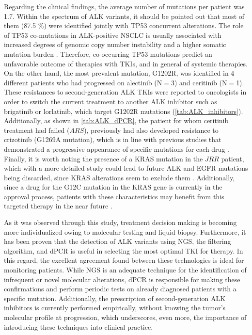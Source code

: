 Regarding the clinical findings, the average number of mutations per patient was 1.7. Within the spectrum of ALK variants, it should be pointed out that most of them (87.5 \%) were identified jointly with TP53 concurrent alterations. The role of TP53 co-mutations in ALK-positive NSCLC is usually associated with increased degrees of genomic copy number instability and a higher somatic mutation burden \cite{NSCLC_alterations}. Therefore, co-occurring TP53 mutations predict an unfavorable outcome of therapies with TKIs, and in general of systemic therapies. On the other hand, the most prevalent mutation, G1202R, was identified in 4 different patients who had progressed on alectinib (N$=$3) and ceritinib (N$=$1). These resistances to second-generation ALK TKIs were reported to oncologists in order to switch the current treatment to another ALK inhibitor such as brigatinib or lorlatinib, which target G1202R mutations (\autoref{tab:ALK_inhibitors}). Additionally, as shown in \autoref{tab:ALK_dPCR}, the patient for whom ceritinib treatment had failed ($ARS$), previously had also developed resistance to crizotinib (G1269A mutation), which is in line with previous studies that demonstrated a progressive appearance of specific mutations for each drug \cite{ALK_resistance, ALK_inhibitors}. Finally, it is worth noting the presence of a KRAS mutation in the $JRR$ patient, which with a more detailed study could lead to future ALK and EGFR mutations being discarded, since KRAS alterations seem to exclude them \cite{Mol_bio, NSCLC_therapies}. Additionally, since a drug for the G12C mutation in the KRAS gene is currently in the approval process, patients with these characteristics may benefit from this targeted therapy in the near future \cite{KRAS_inhib}.

As it was observed through this study, treatment decision making is becoming more individualized owing to molecular testing and liquid biopsy. Furthermore, it has been proven that the detection of ALK variants using NGS, the filtering algorithm, and dPCR is useful in selecting the most optimal TKI for therapy. In this regard, the excellent agreement found between these technologies is ideal for monitoring patients. While NGS is an adequate technique for the identification of infrequent or novel molecular alterations, dPCR is responsible for making these confirmations and perform periodic tests on already diagnosed patients with a specific mutation. Additionally, the prescription of second-generation ALK inhibitors is currently performed empirically, without knowing the tumor's molecular profile at progression, which underscores, even more, the importance of introducing these techniques into clinical practice.

